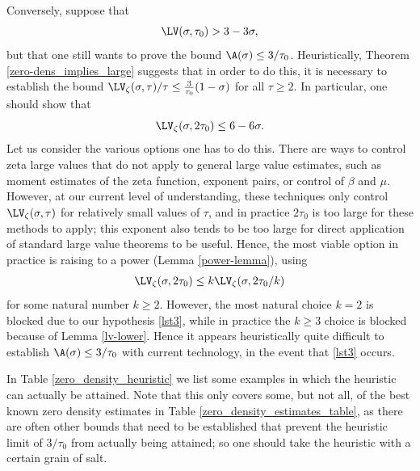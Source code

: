Conversely, suppose that
\begin{equation}\label{lst3}
    \LV(\sigma,\tau_0) > 3-3\sigma,
\end{equation}
but that one still wants to prove the bound $\A(\sigma) \leq 3/\tau_0$. Heuristically, Theorem \ref{zero-dens_implies_large} suggests that in order to do this, it is necessary to establish the bound $\LV_\zeta(\sigma,\tau)/\tau \leq \frac{3}{\tau_0}(1-\sigma)$ for all $\tau \geq 2$.  In particular, one should show that
$$ \LV_\zeta(\sigma,2\tau_0) \leq 6-6\sigma.$$
Let us consider the various options one has to do this.  There are ways to control zeta large values that do not apply to general large value estimates, such as moment estimates of the zeta function, exponent pairs, or control of $\beta$ and $\mu$.  However, at our current level of understanding, these techniques only control $\LV_\zeta(\sigma,\tau)$ for relatively small values of $\tau$, and in practice $2\tau_0$ is too large for these methods to apply; this exponent also tends to be too large for direct application of standard large value theorems to be useful.  Hence, the most viable option in practice is raising to a power (Lemma \ref{power-lemma}), using
$$ \LV_\zeta(\sigma,2\tau_0) \leq k \LV_\zeta(\sigma,2\tau_0/k)$$
for some natural number $k \geq 2$.  However, the most natural choice $k=2$ is blocked due to our hypothesis \eqref{lst3}, while in practice the $k \geq 3$ choice is blocked because of Lemma \ref{lv-lower}.  Hence it appears heuristically quite difficult to establish $\A(\sigma) \leq 3/\tau_0$ with current technology, in the event that \eqref{lst3} occurs.

In Table \ref{zero_density_heuristic} we list some examples in which the heuristic can actually be attained.  Note that this only covers some, but not all, of the best known zero density estimates in Table \ref{zero_density_estimates_table}, as there are often other bounds that need to be established that prevent the heuristic limit of $3/\tau_0$ from actually being attained; so one should take the heuristic with a certain grain of salt.

